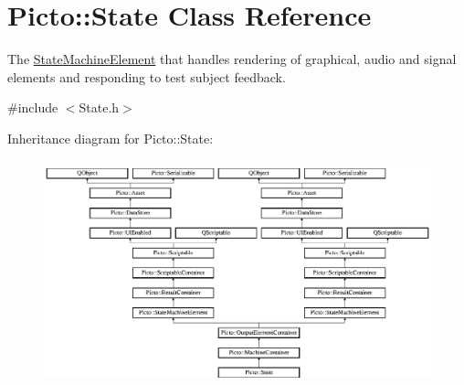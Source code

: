 \hypertarget{class_picto_1_1_state}{\section{Picto\-:\-:State Class Reference}
\label{class_picto_1_1_state}
}


The \hyperlink{class_picto_1_1_state_machine_element}{State\-Machine\-Element} that handles rendering of graphical, audio and signal elements and responding to test subject feedback.  




{\ttfamily \#include $<$State.\-h$>$}

Inheritance diagram for Picto\-:\-:State\-:\begin{figure}[H]
\begin{center}
\leavevmode
\includegraphics[height=6.484210cm]{class_picto_1_1_state}
\end{center}
\end{figure}
